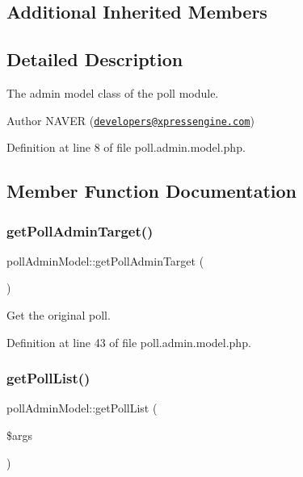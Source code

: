 \subsection*{Additional Inherited Members}


\subsection{Detailed Description}
The admin model class of the poll module. 

\begin{DoxyAuthor}{Author}
N\+A\+V\+ER (\href{mailto:developers@xpressengine.com}{\tt developers@xpressengine.\+com}) 
\end{DoxyAuthor}


Definition at line 8 of file poll.\+admin.\+model.\+php.



\subsection{Member Function Documentation}
\mbox{\label{classpollAdminModel_ab66a2c6d66e9bebfabf443255c78e401}} 
\subsubsection{\texorpdfstring{get\+Poll\+Admin\+Target()}{getPollAdminTarget()}}
{\footnotesize\ttfamily poll\+Admin\+Model\+::get\+Poll\+Admin\+Target (\begin{DoxyParamCaption}{ }\end{DoxyParamCaption})}



Get the original poll. 



Definition at line 43 of file poll.\+admin.\+model.\+php.

\mbox{\label{classpollAdminModel_a96ab22244c98bf1b777265f0027aca6e}} 
\subsubsection{\texorpdfstring{get\+Poll\+List()}{getPollList()}}
{\footnotesize\ttfamily poll\+Admin\+Model\+::get\+Poll\+List (\begin{DoxyParamCaption}\item[{}]{\$args }\end{DoxyParamCaption})}



